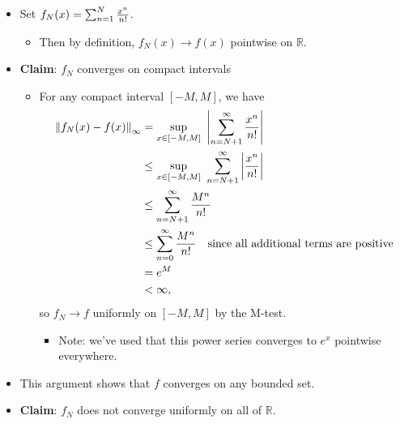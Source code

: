 \begin{solution}

\envlist

\begin{itemize}
\item
  Set \(f_N(x) = \sum_{n=1}^N {x^n \over n!}\).

  \begin{itemize}
  \tightlist
  \item
    Then by definition, \(f_N(x) \to f(x)\) pointwise on
    \({\mathbb{R}}\).
  \end{itemize}
\item
  \textbf{Claim}: \(f_N\) converges on compact intervals

  \begin{itemize}
  \tightlist
  \item
    For any compact interval \([-M, M]\), we have
    \begin{align*}
    {\left\lVert {f_N(x) - f(x)} \right\rVert}_\infty
    &= \sup_{x\in [-M, M] } ~{\left\lvert {\sum_{n=N+1}^\infty {x^n \over {n!}} } \right\rvert} \\
    &\leq \sup_{x\in [-M, M] } ~\sum_{n=N+1}^\infty {\left\lvert { {x^n \over {n!}} } \right\rvert} \\
    &\leq \sum_{n=N+1}^\infty {M^n \over n!} \\
    &\leq \sum_{n=0}^\infty {M^n \over  {n!} } \quad\text{since all additional terms are positive} \\
    &= e^M \\
    &<\infty
    ,\end{align*}
    so \(f_N \to f\) uniformly on \([-M, M]\) by the M-test.

    \begin{itemize}
    \tightlist
    \item
      Note: we've used that this power series converges to \(e^x\)
      pointwise everywhere.
    \end{itemize}
  \end{itemize}
\item
  This argument shows that \(f\) converges on any bounded set.
\item
  \textbf{Claim}: \(f_N\) does not converge uniformly on all of
  \({\mathbb{R}}\).


\end{itemize}
\end{solution}
